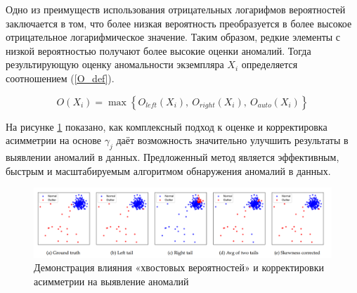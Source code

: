 Одно из преимуществ использования отрицательных логарифмов вероятностей заключается в том, что более низкая вероятность преобразуется в более высокое отрицательное логарифмическое значение. Таким образом, редкие элементы с низкой вероятностью получают более высокие оценки аномалий. Тогда результирующую оценку аномальности экземпляра $X_i$ определяется соотношением (\ref{O_def}).

\begin{equation}\label{O_def}
    O(X_i) = \max{ \left\{ O_{left}(X_i),\ O_{right}(X_i),\ O_{auto}(X_i) \right\} } 
\end{equation}


На рисунке \ref{fig:ecod-demo} показано, как комплексный подход к оценке и корректировка асимметрии на основе $\gamma_j$  даёт возможность значительно улучшить результаты в выявлении аномалий в данных. Предложенный метод является эффективным, быстрым и масштабируемым алгоритмом обнаружения аномалий в данных.

\begin{figure}
  \centering
  \includegraphics[scale=0.22]{inc/images/ecod-demo.png}
  \caption{Демонстрация влияния «хвостовых вероятностей» и корректировки асимметрии на выявление аномалий \cite{ECOD}}
  \label{fig:ecod-demo}
\end{figure}
